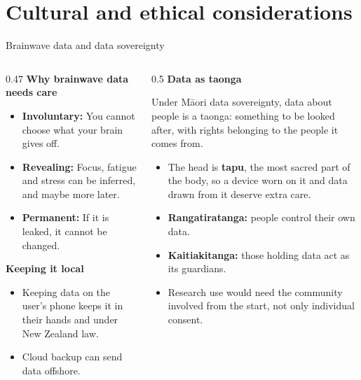 \documentclass[aspectratio=169,11pt]{beamer}
\begin{document}
\section{Cultural and ethical considerations}

\begin{frame}{Brainwave data and data sovereignty}
  \footnotesize
  \begin{columns}[T]
    \begin{column}{0.47\textwidth}
      \textbf{Why brainwave data needs care}
      \begin{itemize}\setlength{\itemsep}{0pt}\setlength{\parsep}{0pt}\setlength{\topsep}{0pt}
        \item \textbf{Involuntary:} You cannot choose what your brain gives off.
        \item \textbf{Revealing:} Focus, fatigue and stress can be inferred, and maybe more later.
        \item \textbf{Permanent:} If it is leaked, it cannot be changed.
      \end{itemize}
      \textbf{Keeping it local}
      \begin{itemize}\setlength{\itemsep}{0pt}\setlength{\parsep}{0pt}\setlength{\topsep}{0pt}
        \item Keeping data on the user's phone keeps it in their hands and under New Zealand law.
        \item Cloud backup can send data offshore.
      \end{itemize}
    \end{column}

    \begin{column}{0.5\textwidth}
      \textbf{Data as taonga}

      Under Māori data sovereignty, data about people is a taonga: something to be looked after, with rights belonging to the people it comes from.
      \begin{itemize}\setlength{\itemsep}{0pt}\setlength{\parsep}{0pt}\setlength{\topsep}{0pt}
        \item The head is \textbf{tapu}, the most sacred part of the body, so a device worn on it and data drawn from it deserve extra care.
        \item \textbf{Rangatiratanga:} people control their own data.
        \item \textbf{Kaitiakitanga:} those holding data act as its guardians.
        \item Research use would need the community involved from the start, not only individual consent.
      \end{itemize}
    \end{column}
  \end{columns}

\end{frame}
\end{document}
